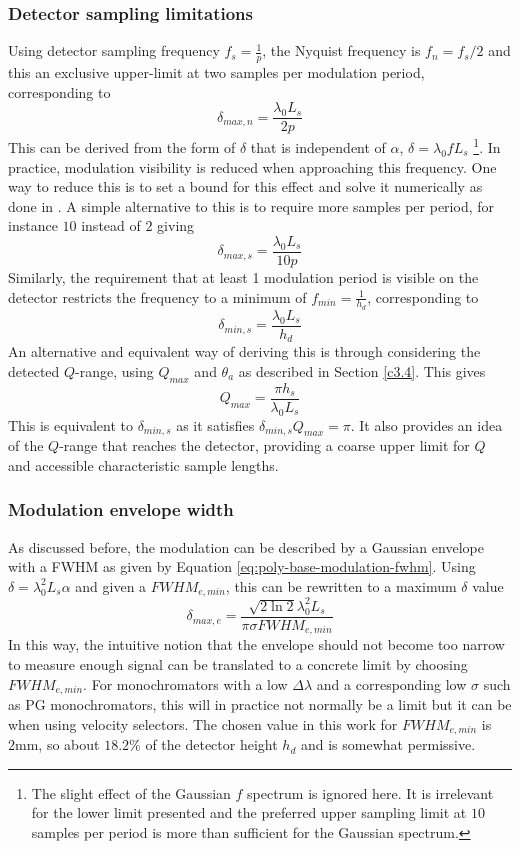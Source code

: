 \documentclass{article}
\begin{document}
\subsubsection{Detector sampling limitations}
Using detector sampling frequency $f_s = \frac{1}{p}$, the Nyquist frequency is $f_n = f_s/2$ and this an exclusive upper-limit at two samples per modulation period, corresponding to 
$$\delta_{max,n} = \frac{\lambda_0L_s}{2p}$$
This can be derived from the form of $\delta$ that is independent of $\alpha$, $\delta = \lambda_0 fL_s$ \footnote{The slight effect of the Gaussian $f$ spectrum is ignored here. It is irrelevant for the lower limit presented and the preferred upper sampling limit at $10$ samples per period is more than sufficient for the Gaussian spectrum.}. In practice, modulation visibility is reduced when approaching this frequency. One way to reduce this is to set a bound for this effect and solve it numerically as done in \cite{kusmin2017}. A simple alternative to this is to require more samples per period, for instance $10$ instead of $2$ giving
$$\delta_{max,s} = \frac{\lambda_0L_s}{10p}$$
Similarly, the requirement that at least 1 modulation period is visible on the detector restricts the frequency to a minimum of $f_{min} = \frac{1}{h_d}$, corresponding to 
$$\delta_{min,s} = \frac{\lambda_0L_s}{h_d}$$
An alternative and equivalent way of deriving this is through considering the detected $Q$-range, using $Q_{max}$ and $\theta_a$ as described in Section \ref{c3.4}. This gives 
$$Q_{max} = \frac{\pi h_s}{\lambda_0 L_s}$$
This is equivalent to $\delta_{min,s}$ as it satisfies $\delta_{min,s} Q_{max} = \pi$. It also provides an idea of the $Q$-range that reaches the detector, providing a coarse upper limit for $Q$ and accessible characteristic sample lengths. 

\subsubsection{Modulation envelope width}
As discussed before, the modulation can be described by a Gaussian envelope with a FWHM as given by Equation \eqref{eq:poly-base-modulation-fwhm}. Using $\delta = \lambda_0^2L_s\alpha$ and given a $FWHM_{e,min}$, this can be rewritten to a maximum $\delta$ value
$$\delta_{max,e} = \frac{\sqrt{2\ln 2}\lambda_0^2 L_s}{\pi\sigma FWHM_{e,min}}$$
In this way, the intuitive notion that the envelope should not become too narrow to measure enough signal can be translated to a concrete limit by choosing $FWHM_{e,min}$. For monochromators with a low $\Delta\lambda$ and a corresponding low $\sigma$ such as PG monochromators, this will in practice not normally be a limit but it can be when using velocity selectors. The chosen value in this work for $FWHM_{e,min}$ is $2 \unit{\milli\meter}$, so about $18.2$\% of the detector height $h_d$ and is somewhat permissive.  
\end{document}
